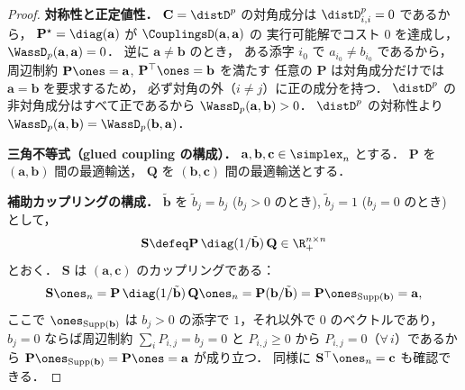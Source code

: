 \begin{proof}
  \textbf{対称性と正定値性．}
  $\mathbf{C} = \distD^p$ の対角成分は $\distD_{i,i}^p = 0$ であるから，
  $\mathbf{P}^\star = \diag(\mathbf{a})$ が $\CouplingsD(\mathbf{a}, \mathbf{a})$ の
  実行可能解でコスト $0$ を達成し，$\WassD_p(\mathbf{a}, \mathbf{a}) = 0$．
  逆に $\mathbf{a} \neq \mathbf{b}$ のとき，
  ある添字 $i_0$ で $a_{i_0} \neq b_{i_0}$ であるから，
  周辺制約 $\mathbf{P}\ones = \mathbf{a}$, $\mathbf{P}^\top\ones = \mathbf{b}$ を満たす
  任意の $\mathbf{P}$ は対角成分だけでは $\mathbf{a} = \mathbf{b}$ を要求するため，
  必ず対角の外（$i \neq j$）に正の成分を持つ．
  $\distD^p$ の非対角成分はすべて正であるから $\WassD_p(\mathbf{a}, \mathbf{b}) > 0$．
  $\distD^p$ の対称性より $\WassD_p(\mathbf{a}, \mathbf{b}) = \WassD_p(\mathbf{b}, \mathbf{a})$．

  \medskip
  \textbf{三角不等式（glued coupling の構成）．}
  $\mathbf{a}, \mathbf{b}, \mathbf{c} \in \simplex_n$ とする．
  $\mathbf{P}$ を $(\mathbf{a}, \mathbf{b})$ 間の最適輸送，
  $\mathbf{Q}$ を $(\mathbf{b}, \mathbf{c})$ 間の最適輸送とする．

  \textbf{補助カップリングの構成．}
  $\tilde{\mathbf{b}}$ を $\tilde{b}_j = b_j$ ($b_j > 0$ のとき),
  $\tilde{b}_j = 1$ ($b_j = 0$ のとき) として，
  \[
    \mathbf{S} \defeq \mathbf{P} \, \diag(1 / \tilde{\mathbf{b}}) \, \mathbf{Q}
    \in \R_+^{n \times n}
  \]
  とおく．
  $\mathbf{S}$ は $(\mathbf{a}, \mathbf{c})$ のカップリングである：
  \[
    \mathbf{S} \ones_n
    = \mathbf{P} \, \diag(1/\tilde{\mathbf{b}}) \, \mathbf{Q} \ones_n
    = \mathbf{P} (\mathbf{b} / \tilde{\mathbf{b}})
    = \mathbf{P} \ones_{\mathrm{Supp}(\mathbf{b})}
    = \mathbf{a},
  \]
  ここで $\ones_{\mathrm{Supp}(\mathbf{b})}$ は
  $b_j > 0$ の添字で $1$，それ以外で $0$ のベクトルであり，
  $b_j = 0$ ならば周辺制約 $\sum_i P_{i,j} = b_j = 0$ と
  $P_{i,j} \geq 0$ から $P_{i,j} = 0$（$\forall\, i$）であるから
  $\mathbf{P} \ones_{\mathrm{Supp}(\mathbf{b})} = \mathbf{P} \ones = \mathbf{a}$
  が成り立つ．
  同様に $\mathbf{S}^\top \ones_n = \mathbf{c}$ も確認できる．


\end{proof}
